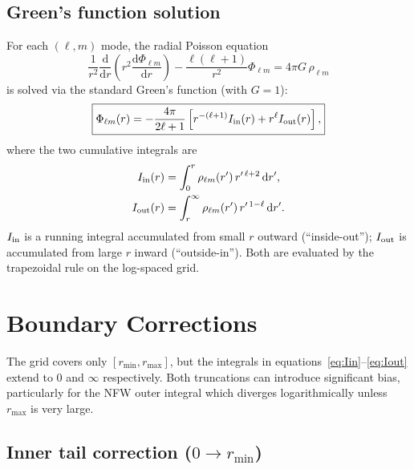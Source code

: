 \documentclass[11pt]{article}
\begin{document}
\subsection{Green's function solution}

For each $(\ell,m)$ mode, the radial Poisson equation
\begin{equation}
  \frac{1}{r^2}\frac{\mathrm{d}}{\mathrm{d}r}\!\left(r^2
  \frac{\mathrm{d}\Phi_{\ell m}}{\mathrm{d}r}\right)
  - \frac{\ell(\ell+1)}{r^2}\Phi_{\ell m} = 4\pi G\,\rho_{\ell m}
\end{equation}
is solved via the standard Green's function (with $G=1$):
\begin{equation}
  \boxed{
  \Phi_{\ell m}(r) = -\frac{4\pi}{2\ell+1}
  \left[
    r^{-(\ell+1)} I_{\rm in}(r)
    + r^{\ell} I_{\rm out}(r)
  \right],
  }
\end{equation}
where the two cumulative integrals are
\begin{align}
  I_{\rm in}(r)  &= \int_0^r \rho_{\ell m}(r')\, r^{\prime\,\ell+2}\,
                    \mathrm{d}r', \label{eq:Iin} \\
  I_{\rm out}(r) &= \int_r^\infty \rho_{\ell m}(r')\, r^{\prime\,1-\ell}\,
                    \mathrm{d}r'. \label{eq:Iout}
\end{align}
$I_{\rm in}$ is a running integral accumulated from small $r$ outward
(``inside-out''); $I_{\rm out}$ is accumulated from large $r$ inward
(``outside-in'').  Both are evaluated by the trapezoidal rule on the
log-spaced grid.

\section{Boundary Corrections}
\label{sec:boundary}

The grid covers only $[r_{\min}, r_{\max}]$, but the integrals in
equations~\eqref{eq:Iin}--\eqref{eq:Iout} extend to $0$ and $\infty$
respectively.  Both truncations can introduce significant bias, particularly
for the NFW outer integral which diverges logarithmically unless $r_{\max}$ is
very large.

\subsection{Inner tail correction ($0 \to r_{\min}$)}
\end{document}
